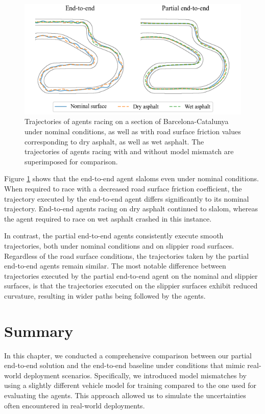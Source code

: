 \begin{figure}[htb!]
    \centering
    \includegraphics[width=\textwidth]{contents/chapt7/figs/mu/mu_lap.png}
    \caption[Trajectories of agents racing with a decreased road surface friction coefficient]{Trajectories of agents racing on a section of Barcelona-Catalunya under nominal conditions, as well as with road surface friction values corresponding to dry asphalt, as well as wet asphalt. The trajectories of agents racing with and without model mismatch are superimposed for comparison.}
    \label{fig:mu_lap}
\end{figure}


Figure \ref{fig:mu_lap} shows that the end-to-end agent slaloms even under nominal conditions.
When required to race with a decreased road surface friction coefficient, the trajectory executed by the end-to-end agent differs significantly to its nominal trajectory.
End-to-end agents racing on dry asphalt continued to slalom, whereas the agent required to race on wet asphalt crashed in this instance.

In contrast, the partial end-to-end agents consistently execute smooth trajectories, both under nominal conditions and on slippier road surfaces. 
Regardless of the road surface conditions, the trajectories taken by the partial end-to-end agents remain similar. 
The most notable difference between trajectories executed by the partial end-to-end agent on the nominal and slippier surfaces, is that the trajectories executed on the slippier surfaces exhibit reduced curvature, resulting in wider paths being followed by the agents.


\section{Summary}

In this chapter, we conducted a comprehensive comparison between our partial end-to-end solution and the end-to-end baseline under conditions that mimic real-world deployment scenarios. 
Specifically, we introduced model mismatches by using a slightly different vehicle model for training compared to the one used for evaluating the agents. 
This approach allowed us to simulate the uncertainties often encountered in real-world deployments.


